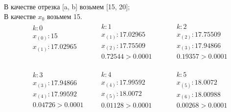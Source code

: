 \documentclass[letterpaper, 11pt]{extarticle}
\begin{document}
\noindent В качестве отрезка [a, b] возьмем [15, 20];\\
\noindent В качестве $x_0$ возьмем 15.\\

\begin{align*}
    \begin{aligned}
        & k: 0 \\
        & x_{(0)}: 15 \\
        & x_{(1)}: 17.02965 \\
        & \\
    \end{aligned}
    \qquad
    \begin{aligned}
        & k: 1 \\
        & x_{(1)}: 17.02965 \\
        & x_{(2)}: 17.75509 \\
        & 0.72544 > 0.0001
    \end{aligned}
    \qquad
    \begin{aligned}
        & k: 2 \\
        & x_{(2)}: 17.75509 \\
        & x_{(3)}: 17.94866 \\
        & 0.19357 > 0.0001
    \end{aligned}
\end{align*}

\vspace{-5pt}

\begin{align*}
    \begin{aligned}
        & k: 3 \\
        & x_{(3)}: 17.94866 \\
        & x_{(4)}: 17.99592 \\
        & 0.04726 > 0.0001
    \end{aligned}
    \quad
    \begin{aligned}
        & k: 4 \\
        & x_{(4)}: 17.99592 \\
        & x_{(5)}: 18.0072 \\
        & 0.01128 > 0.0001
    \end{aligned}
    \qquad
    \begin{aligned}
        & k: 5 \\
        & x_{(5)}: 18.0072 \\
        & x_{(6)}: 18.00988 \\
        & 0.00268 > 0.0001
    \end{aligned}
\end{align*}
\end{document}
